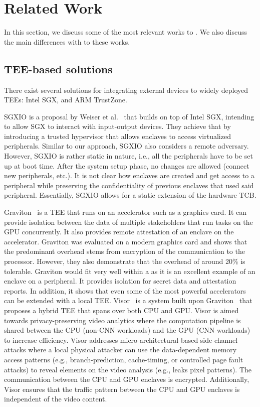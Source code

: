 \section{Related Work}
\label{sec:relatedWork}

In this section, we discuss some of the most relevant works to \name. We also discuss the main differences with \name to these works.


\subsection{TEE-based solutions}
There exist several solutions for integrating external devices to widely deployed TEEs: Intel SGX, and ARM TrustZone. 

 SGXIO is a proposal by Weiser et al.~\cite{weiser2017sgxio} that builds on top of Intel SGX, intending to allow SGX to interact with input-output devices. They achieve that by introducing a trusted hypervisor that allows enclaves to access virtualized peripherals. Similar to our approach, SGXIO also considers a remote adversary. However, SGXIO is rather static in nature, i.e., all the peripherals have to be set up at boot time. After the system setup phase, no changes are allowed (connect new peripherals, etc.). It is not clear how enclaves are created and get access to a peripheral while preserving the confidentiality of previous enclaves that used said peripheral. Essentially, SGXIO allows for a static extension of the hardware TCB.

 Graviton~\cite{volos2018graviton} is a TEE that runs on an accelerator such as a graphics card. It can provide isolation between the data of multiple stakeholders that run tasks on the GPU concurrently. It also provides remote attestation of an enclave on the accelerator. Graviton was evaluated on a modern graphics card and shows that the predominant overhead stems from encryption of the communication to the processor. However, they also demonstrate that the overhead of around 20\% is tolerable. Graviton would fit very well within a \name{} as it is an excellent example of an enclave on a peripheral. It provides isolation for secret data and attestation reports. In addition, it shows that even some of the most powerful accelerators can be extended with a local TEE. Visor~\cite{visor} is a system built upon Graviton~\cite{volos2018graviton} that proposes a hybrid TEE that spans over both CPU and GPU. Visor is aimed towards privacy-preserving video analytics where the computation pipeline is shared between the CPU (non-CNN workloads) and the GPU (CNN workloads) to increase efficiency. Visor addresses micro-architectural-based side-channel attacks where a local physical attacker can use the data-dependent memory access patterns (e.g., branch-prediction, cache-timing, or controlled page fault attacks) to reveal elements on the video analysis (e.g., leaks pixel patterns). The communication between the CPU and GPU enclaves is encrypted. Additionally, Visor ensures that the traffic pattern between the CPU and GPU enclaves is independent of the video content.


